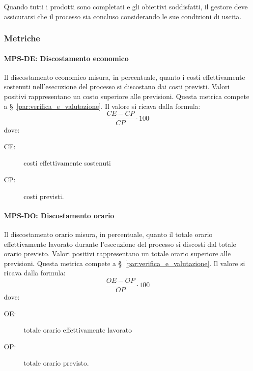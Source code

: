 \documentclass[../../norme-di-progetto.tex]{subfiles}
\begin{document}
Quando tutti i prodotti sono completati e gli obiettivi soddisfatti, il gestore deve assicurarsi che il processo sia concluso considerando le sue condizioni di uscita.

\subsubsection{Metriche}%
\label{subs:gestione-di-processo/metriche}

\paragraph{MPS-DE: Discostamento economico}%
\label{par:MPS-DE_discostamento_economico}

Il discostamento economico misura, in percentuale, quanto i costi effettivamente sostenuti nell'esecuzione del processo si discostano dai costi previsti.
Valori positivi rappresentano un costo superiore alle previsioni.
Questa metrica compete a §~\ref{par:verifica_e_valutazione}.
Il valore si ricava dalla formula:
\begin{equation}
  \frac{CE-CP}{CP}\cdot 100
\end{equation}
dove:
\begin{description}
  \item[CE:] costi effettivamente sostenuti
  \item[CP:] costi previsti.
\end{description}

\paragraph{MPS-DO: Discostamento orario}%
\label{par:MPS-DO_discostamento_orario}

Il discostamento orario misura, in percentuale, quanto il totale orario effettivamente lavorato durante l'esecuzione del processo si discosti dal totale orario previsto.
Valori positivi rappresentano un totale orario superiore alle previsioni.
Questa metrica compete a §~\ref{par:verifica_e_valutazione}.
Il valore si ricava dalla formula:
\begin{equation}
  \frac{OE-OP}{OP}\cdot 100
\end{equation}
dove:
\begin{description}
  \item[OE:] totale orario effettivamente lavorato
  \item[OP:] totale orario previsto.
\end{description}
\end{document}
